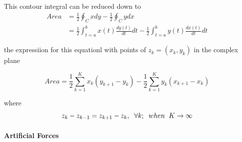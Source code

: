 \documentclass[twoside]{article}
\begin{document}
	This contour integral can be reduced down to
	\begin{align*}
Area &= \frac{1}{2} \oint_C xdy - \frac{1}{2} \oint_C ydx \\
&= \frac{1}{2} \int_{t=a}^{b} x(t)\frac{dy(t)}{dt}dt - \frac{1}{2} \int_{t=a}^{b}y(t)\frac{dx(t)}{dt}dt
	\end{align*}
		
			the expressiion for this equationl with points of  $z_k = (x_k,y_k)$ in the complex plane
			
			\begin{equation}
       Area = \frac{1}{2} \sum_{k=1}^{K} x_k(y_{k+1} - y_k) - \frac{1}{2} \sum_{k=1}^{K}y_k(x_{k+1} - x_k)
			\end{equation}
			
				where
				\begin{equation}
				z_k - z_{k-1} = z_{k+1} - z_k, \hspace{0.2cm}  \forall k ;  \hspace{0.2cm} when  \hspace{0.2cm} K \to\infty
				\end{equation}
 \paragraph{Artificial Forces}\hspace{0pt} \\
\end{document}
